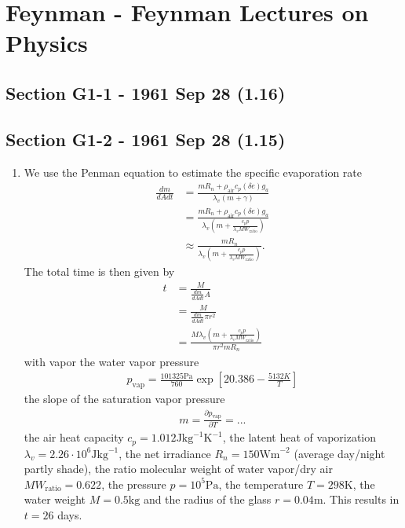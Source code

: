 \documentclass[../main.tex]{subfiles}
\begin{document}
\section{{\sc Feynman} - Feynman Lectures on Physics}
\subsection{Section G1-1 - 1961 Sep 28 (1.16)}
\subsection{Section G1-2 - 1961 Sep 28 (1.15)}
\begin{enumerate}[label=(\alph*)]
\item  We use the Penman equation to estimate the specific evaporation rate
\begin{align}
    \frac{dm}{dA dt}
    &=\frac{m R_n + \rho_\text{air}c_p (\delta e)g_a}{\lambda_v(m+\gamma)}\\
    &=\frac{m R_n + \rho_\text{air}c_p (\delta e)g_a}{\lambda_v(m+\frac{c_p p}{\lambda_v MW_\text{ratio}})}\\
    &\approx\frac{m R_n}{\lambda_v(m+\frac{c_p p}{\lambda_v MW_\text{ratio}})}.
\end{align}
The total time is then given by
\begin{align}
    t&=\frac{M}{\frac{dm}{dA dt}A}\\
    &=\frac{M}{\frac{dm}{dA dt}\pi r^2}\\
    &=\frac{M\lambda_v(m+\frac{c_p p}{\lambda_v MW_\text{ratio}})}{\pi r^2 m R_n }
\end{align}
with vapor the water vapor pressure
\begin{align}
    p_\text{vap}=\frac{101325\text{Pa}}{760} \exp\left[20.386 - \frac{5132K}{T}\right]
\end{align}
the slope of the saturation vapor pressure
\begin{align}
    m=\frac{\partial p_\text{vap}}{\partial T}=...
\end{align}
the air heat capacity $c_p=1.012\text{J}\text{kg}^{-1}\text{K}^{-1}$, the latent heat of vaporization $\lambda_v=2.26\cdot10^6 \text{J}\text{kg}^{-1}$, the net irradiance $R_n=150\text{Wm}^{-2}$ (average day/night partly shade), the ratio molecular weight of water vapor/dry air $MW_\text{ratio}=0.622$, the pressure $p=10^5\text{Pa}$, the temperature $T= 298\text{K}$, the water weight $M=0.5\text{kg}$ and the radius of the glass $r=0.04\text{m}$. This results in $t=26$ days.


\end{enumerate}
\end{document}
